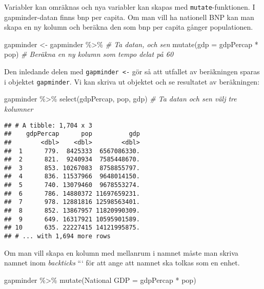 \documentclass[
]{book}
\newenvironment{Shaded}{\begin{snugshade}}{\end{snugshade}}
\newcommand{\AttributeTok}[1]{\textcolor[rgb]{0.77,0.63,0.00}{#1}}
\newcommand{\CommentTok}[1]{\textcolor[rgb]{0.56,0.35,0.01}{\textit{#1}}}
\newcommand{\FunctionTok}[1]{\textcolor[rgb]{0.00,0.00,0.00}{#1}}
\newcommand{\NormalTok}[1]{#1}
\newcommand{\OtherTok}[1]{\textcolor[rgb]{0.56,0.35,0.01}{#1}}
\newcommand{\SpecialCharTok}[1]{\textcolor[rgb]{0.00,0.00,0.00}{#1}}
\newcommand{\StringTok}[1]{\textcolor[rgb]{0.31,0.60,0.02}{#1}}
\theoremstyle{definition}
\theoremstyle{definition}
\theoremstyle{definition}
\theoremstyle{definition}
\theoremstyle{remark}
\begin{document}
Variabler kan omräknas och nya variabler kan skapas med \texttt{mutate}-funktionen. I gapminder-datan finns bnp per capita. Om man vill ha nationell BNP kan man skapa en ny kolumn och beräkna den som bnp per capita gånger populationen.

\begin{Shaded}
\begin{Highlighting}[]
\NormalTok{gapminder }\OtherTok{\textless{}{-}}\NormalTok{ gapminder }\SpecialCharTok{\%\textgreater{}\%}             \CommentTok{\# Ta datan, och sen}
  \FunctionTok{mutate}\NormalTok{(}\AttributeTok{gdp =}\NormalTok{ gdpPercap }\SpecialCharTok{*}\NormalTok{ pop)        }\CommentTok{\# Beräkna en ny kolumn som tempo delat på 60}
\end{Highlighting}
\end{Shaded}

Den inledande delen med \texttt{gapminder\ \textless{}-} gör så att utfallet av beräkningen sparas i objektet \texttt{gapminder}.
Vi kan skriva ut objektet och se resultatet av beräkningen:

\begin{Shaded}
\begin{Highlighting}[]
\NormalTok{gapminder }\SpecialCharTok{\%\textgreater{}\%} \FunctionTok{select}\NormalTok{(gdpPercap, pop, gdp)        }\CommentTok{\# Ta datan och sen välj tre kolumner}
\end{Highlighting}
\end{Shaded}

\begin{verbatim}
## # A tibble: 1,704 x 3
##    gdpPercap      pop          gdp
##        <dbl>    <dbl>        <dbl>
##  1      779.  8425333  6567086330.
##  2      821.  9240934  7585448670.
##  3      853. 10267083  8758855797.
##  4      836. 11537966  9648014150.
##  5      740. 13079460  9678553274.
##  6      786. 14880372 11697659231.
##  7      978. 12881816 12598563401.
##  8      852. 13867957 11820990309.
##  9      649. 16317921 10595901589.
## 10      635. 22227415 14121995875.
## # ... with 1,694 more rows
\end{verbatim}

Om man vill skapa en kolumn med mellanrum i namnet måste man skriva namnet inom \emph{backticks} ``` för att ange att namnet ska tolkas som en enhet.

\begin{Shaded}
\begin{Highlighting}[]
\NormalTok{gapminder }\SpecialCharTok{\%\textgreater{}\%} 
  \FunctionTok{mutate}\NormalTok{(}\StringTok{\textasciigrave{}}\AttributeTok{National GDP}\StringTok{\textasciigrave{}} \OtherTok{=}\NormalTok{ gdpPercap }\SpecialCharTok{*}\NormalTok{ pop)}
\end{Highlighting}
\end{Shaded}
\end{document}
